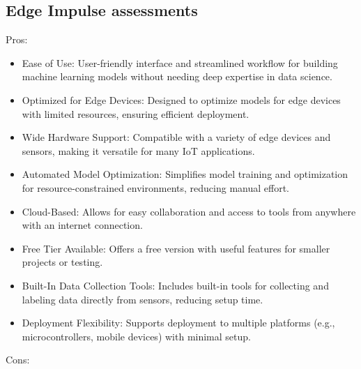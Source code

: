 \subsection{Edge Impulse assessments}
Pros:
\begin{itemize}
    \item Ease of Use: User-friendly interface and streamlined workflow for building machine learning models without needing deep expertise in data science.
    \item Optimized for Edge Devices: Designed to optimize models for edge devices with limited resources, ensuring efficient deployment.
    \item Wide Hardware Support: Compatible with a variety of edge devices and sensors, making it versatile for many IoT applications.
    \item Automated Model Optimization: Simplifies model training and optimization for resource-constrained environments, reducing manual effort.
    \item Cloud-Based: Allows for easy collaboration and access to tools from anywhere with an internet connection.
    \item Free Tier Available: Offers a free version with useful features for smaller projects or testing.
    \item Built-In Data Collection Tools: Includes built-in tools for collecting and labeling data directly from sensors, reducing setup time.
    \item Deployment Flexibility: Supports deployment to multiple platforms (e.g., microcontrollers, mobile devices) with minimal setup.
\end{itemize}
Cons:
